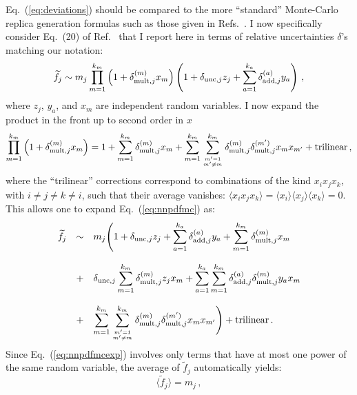 \documentclass[10pt,a4paper]{article}
\begin{document}
Eq.~(\ref{eq:deviations}) should be compared to the more ``standard''
Monte-Carlo replica generation formulas such as those given in
Refs.~\cite{Ball:2008by, Ball:2014uwa}. I now specifically consider
Eq.~(20) of Ref.~\cite{Ball:2014uwa} that I report here in terms of
relative uncertainties $\delta$'s matching our notation:
\begin{equation}\label{eq:nnpdfmc}
\widetilde{f}_j\sim m_j\prod_{m=1}^{k_m}\left(1+\delta_{{\rm mult},j}^{(m)} x_m\right)\left(1+\delta_{{\rm unc},j} z_j+\sum_{a=1}^{k_a} \delta_{{\rm add},j}^{(a)} y_a\right)\,,
\end{equation}
where $z_j$, $y_a$, and $x_m$ are independent random variables. I now
expand the product in the front up to second order in $x$
\begin{equation}
  \prod_{m=1}^{k_m}\left(1+\delta_{{\rm mult},j}^{(m)}
    x_m\right)=1+\sum_{m=1}^{k_m}\delta_{{\rm mult},j}^{(m)}
  x_m+\sum_{m=1}^{k_m}\sum_{m'=1\atop m'\neq m}^{k_m}\delta_{{\rm
      mult},j}^{(m)}\delta_{{\rm mult},j}^{(m')}x_m x_{m'}+\mbox{trilinear}\,,
\end{equation}
where the ``trilinear'' corrections correspond to combinations of the
kind $x_ix_jx_k$, with $i\neq j\neq k\neq i$, such that their average
vanishes:
$\langle x_ix_jx_k\rangle = \langle x_i\rangle \langle x_j
\rangle\langle x_k\rangle = 0$. This allows one to expand
Eq.~(\ref{eq:nnpdfmc}) as:
\begin{equation}\label{eq:nnpdfmcexp}
\begin{array}{rcl}
\widetilde{f}_j&\sim&\displaystyle m_j\Bigg(1+\delta_{{\rm unc},j} z_j+\sum_{a=1}^{k_a} \delta_{{\rm add},j}^{(a)} y_a +\sum_{m=1}^{k_m}\delta_{{\rm mult},j}^{(m)}
  x_m\\
\\
&+&\displaystyle\delta_{{\rm unc},j} \sum_{m=1}^{k_m} \delta_{{\rm mult},j}^{(m)}
    z_jx_m+\sum_{a=1}^{k_a} \sum_{m=1}^{k_m}\delta_{{\rm add},j}^{(a)} \delta_{{\rm mult},j}^{(m)} y_a 
  x_m\\
\\
&+&\displaystyle \sum_{m=1}^{k_m}\sum_{m'=1\atop m'\neq m}^{k_m}\delta_{{\rm
      mult},j}^{(m)}\delta_{{\rm mult},j}^{(m')}x_m x_{m'}\Bigg)+\mbox{trilinear}\,.
\end{array}
\end{equation}
Since Eq.~(\ref{eq:nnpdfmcexp}) involves only terms that have at most
one power of the same random variable, the average of
$\widetilde{f}_j$ automatically yields:
\begin{equation}\label{eq:centralvaluenn}
  \langle \widetilde {f}_j\rangle = m_j\,,
\end{equation}
\end{document}
